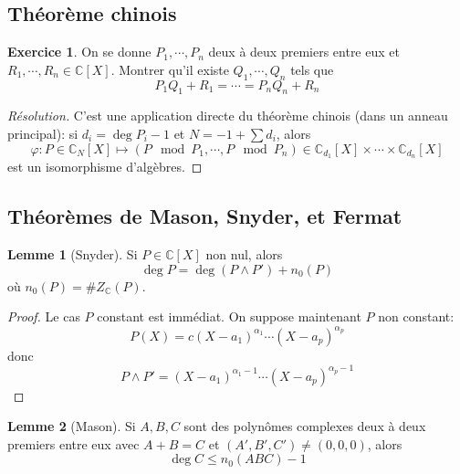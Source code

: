 \documentclass{article}
\theoremstyle{definition}
\newtheorem*{lmm}{Lemme}
\newtheorem*{exo}{Exercice}
\begin{document}
\subsection{Théorème chinois}

\begin{exo}
On se donne $P_1, \cdots, P_n$ deux à deux premiers entre eux et $R_1, \cdots, R_n\in\mathbb C[X]$. Montrer qu'il existe $Q_1, \cdots, Q_n$ tels que \[
    P_1Q_1+R_1=\cdots=P_nQ_n+R_n
\]
\end{exo}

\begin{proof}[Résolution]
    C'est une application directe du théorème chinois (dans un anneau principal): si $d_i=\deg P_i-1$ et $N=-1+\sum d_i$, alors \[
        \varphi: P\in \mathbb C_N[X]\longmapsto (P\mod P_1, \cdots, P\mod P_n)\in\mathbb C_{d_1}[X]\times \cdots \times \mathbb C_{d_n}[X]
    \]
    est un isomorphisme d'algèbres.
\end{proof}

\subsection{Théorèmes de Mason, Snyder, et Fermat}
\begin{lmm}[Snyder]
    Si $P\in\mathbb C[X]$ non nul, alors \[
        \deg P=\deg \left(P\land P'\right)+n_0(P)
    \]
    où $n_0(P)=\#Z_{\mathbb C}(P)$. 
\end{lmm}

\begin{proof}
    Le cas $P$ constant est immédiat. On suppose maintenant $P$ non constant: \[
        P(X)=c(X-a_1)^{\alpha_1}\cdots (X-a_p)^{\alpha_p}
    \]
    donc \[
        P\land P'=(X-a_1)^{\alpha_1-1}\cdots (X-a_p)^{\alpha_p-1}
    \]
\end{proof}

\begin{lmm}[Mason]
    Si $A, B, C$ sont des polynômes complexes deux à deux premiers entre eux avec $A+B=C$ et $(A', B', C')\neq (0, 0, 0)$, alors \[
        \deg C\leq n_0(ABC)-1
    \]
\end{lmm}
\end{document}
